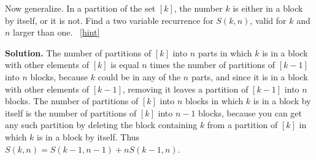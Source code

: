 \documentclass{book}
\begin{document}
\setcounter{project}{200}
\addtocounter{project}{-1}
\begin{activity}[]\label{secondstirlingrecurrence}
\hypertarget{p-1154}{}%
Now generalize.  In a partition of the set \([k]\), the number \(k\) is either in a block by itself, or it is not.  Find a two variable recurrence for \(S(k,n)\), valid for \(k\) and \(n\) larger than one.%
~\hfill{\tiny\hyperlink{a-200}{[hint]}\hypertarget{q-200}{}}\par\smallskip%
\noindent\textbf{Solution.}\hypertarget{solution-124}{}\quad%
\hypertarget{p-1156}{}%
The number of partitions of \([k]\) into \(n\) parts in which \(k\) is in a block with other elements of \([k]\) is equal \(n\) times the number of partitions of \([k-1]\) into \(n\) blocks, because \(k\) could be in any of the \(n\) parts, and since it is in a block with other elements of \([k-1]\), removing it leaves a partition of \([k-1]\) into \(n\) blocks. The number of partitions of \([k]\) into \(n\) blocks in which \(k\) is in a block by itself is the number of partitions of \([k]\) into \(n-1\) blocks, because you can get any such partition by deleting the block containing \(k\) from a partition of \([k]\) in which \(k\) is in a block by itself. Thus \(S(k,n) = S(k-1,n-1) + nS(k-1,n)\).%
\end{activity}
\end{document}
